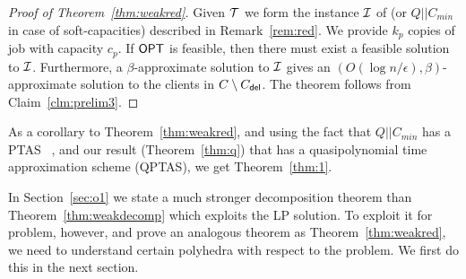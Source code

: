 \begin{proof}[Proof of Theorem~\ref{thm:weakred}]
	Given ${\cal T}$ we form the instance ${\cal I}$  of \cckp (or $Q||C_{min}$ in case of soft-capacities) described in Remark~\ref{rem:red}. We provide $k_p$ copies of job with capacity $c_p$. If $\mathsf{OPT}$ is feasible, then there must exist a feasible solution to ${\cal I}$. Furthermore, a $\beta$-approximate solution to ${\cal I}$ gives an $\left(O(\log n/\epsilon),\beta\right)$-approximate solution to the clients in $C\setminus C_{\mathsf{del}}$. The theorem follows from Claim~\ref{clm:prelim3}.
%	
\end{proof}

As a corollary to Theorem~\ref{thm:weakred}, and using the fact that $Q||C_{min}$ has a PTAS ~\cite{AzarE98},  and our result (Theorem~\ref{thm:q}) that \cckp has a  quasipolynomial time approximation scheme (QPTAS), we get Theorem~\ref{thm:1}.\medskip


In Section~\ref{sec:o1} we state a much stronger decomposition theorem than Theorem~\ref{thm:weakdecomp} which exploits the LP solution.
To exploit it for \mckc problem, however, and prove an analogous theorem as Theorem~\ref{thm:weakred}, we need to understand certain polyhedra with respect to the \cckp problem.
We first do this in the next section.
